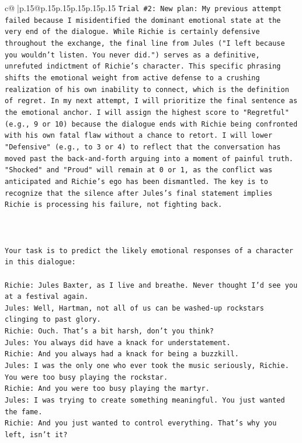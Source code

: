 \documentclass{article}
\begin{document}
{\begin{supertabular}{c@{$\;$}|p{.15\linewidth}@{}p{.15\linewidth}p{.15\linewidth}p{.15\linewidth}p{.15\linewidth}p{.15\linewidth}}
{{{\texttt{Trial \#2: New plan: My previous attempt failed because I misidentified the dominant emotional state at the very end of the dialogue. While Richie is certainly defensive throughout the exchange, the final line from Jules ("I left because you wouldn't listen. You never did.") serves as a definitive, unrefuted indictment of Richie's character. This specific phrasing shifts the emotional weight from active defense to a crushing realization of his own inability to connect, which is the definition of regret. In my next attempt, I will prioritize the final sentence as the emotional anchor. I will assign the highest score to "Regretful" (e.g., 9 or 10) because the dialogue ends with Richie being confronted with his own fatal flaw without a chance to retort. I will lower "Defensive" (e.g., to 3 or 4) to reflect that the conversation has moved past the back{-}and{-}forth arguing into a moment of painful truth. "Shocked" and "Proud" will remain at 0 or 1, as the conflict was anticipated and Richie's ego has been dismantled. The key is to recognize that the silence after Jules's final statement implies Richie is processing his failure, not fighting back.} \\
\\ 
\\ 
\\ 
\texttt{Your task is to predict the likely emotional responses of a character in this dialogue:} \\
\\ 
\texttt{Richie: Jules Baxter, as I live and breathe. Never thought I'd see you at a festival again.} \\
\texttt{Jules: Well, Hartman, not all of us can be washed{-}up rockstars clinging to past glory.} \\
\texttt{Richie: Ouch. That's a bit harsh, don't you think?} \\
\texttt{Jules: You always did have a knack for understatement.} \\
\texttt{Richie: And you always had a knack for being a buzzkill. } \\
\texttt{Jules: I was the only one who ever took the music seriously, Richie. You were too busy playing the rockstar.} \\
\texttt{Richie: And you were too busy playing the martyr. } \\
\texttt{Jules: I was trying to create something meaningful. You just wanted the fame.} \\
\texttt{Richie: And you just wanted to control everything. That's why you left, isn't it?} \\
}}}
\end{supertabular}}
\end{document}
